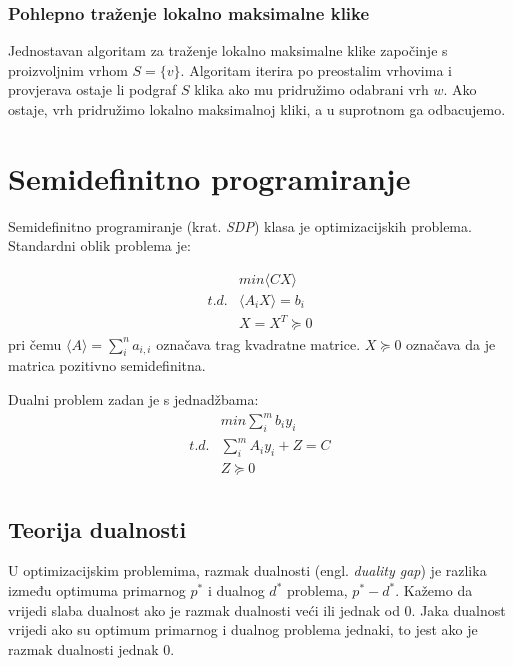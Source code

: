 \documentclass[diplomskirad]{fer}
\begin{document}
\subsection{Pohlepno traženje lokalno maksimalne klike}
Jednostavan algoritam za traženje lokalno maksimalne klike započinje s proizvoljnim vrhom $S = \{v\}$. Algoritam iterira po preostalim vrhovima i provjerava ostaje li
podgraf $S$ klika ako mu pridružimo odabrani vrh $w$. Ako ostaje, vrh pridružimo lokalno maksimalnoj kliki, a u suprotnom ga odbacujemo.

\chapter{Semidefinitno programiranje}
\label{pog:semidefinitno_programiranje}
Semidefinitno programiranje (krat. \textit{SDP}) klasa je optimizacijskih problema.
Standardni oblik problema je:

\begin{equation}
\begin{split}
  & min \langle CX \rangle \\
  t. d. & \langle A_iX \rangle = b_i \\
        & X = X^T \succeq 0
\end{split}
\end{equation}
pri čemu $ \langle A \rangle = \sum_{i}^{n} a_{i,i} $
označava trag kvadratne matrice. $X \succeq 0$ označava da je matrica pozitivno semidefinitna.

Dualni problem zadan je s jednadžbama: 
\begin{equation}
\begin{split}
  & min \sum_{i}^{m} b_iy_i \\
  t.d. & \sum_{i}^{m} A_iy_i + Z = C \\
      & Z \succeq 0 \\
\end{split}
\end{equation}


\section{Teorija dualnosti}
U optimizacijskim problemima, razmak dualnosti (engl. \textit{duality gap}) je razlika između optimuma primarnog $p^*$ i dualnog $d^*$ problema, $p^* - d^*$.
Kažemo da vrijedi slaba dualnost ako je razmak dualnosti veći ili jednak od 0. Jaka dualnost vrijedi ako su optimum primarnog i dualnog problema jednaki, to jest
ako je razmak dualnosti jednak 0. %
\end{document}
